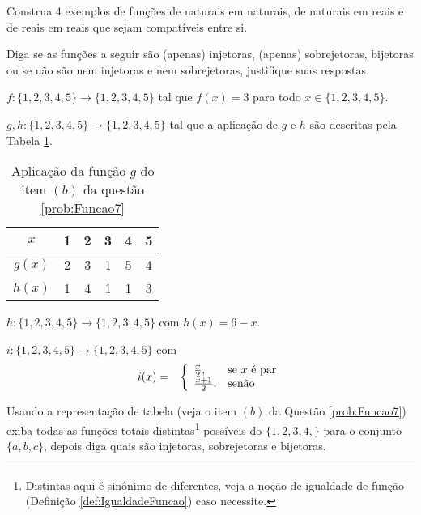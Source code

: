\begin{questao}\label{prob:Funcao6}
	Construa 4 exemplos de funções de naturais em naturais, de naturais em reais e de reais em reais que sejam compatíveis entre si.
\end{questao}

\begin{questao}\label{prob:Funcao7}
  Diga se as funções a seguir são (apenas) injetoras, (apenas) sobrejetoras, bijetoras ou se não são nem injetoras e nem sobrejetoras, justifique suas respostas.
\end{questao}

\begin{exerList}
  \item $f: \{1, 2, 3, 4, 5\} \rightarrow \{1, 2, 3, 4, 5\}$ tal que $f(x) = 3$ para todo $x \in \{1, 2, 3, 4, 5\}$.
  \item $g, h: \{1, 2, 3, 4, 5\} \rightarrow \{1, 2, 3, 4, 5\}$ tal que a aplicação de $g$ e $h$ são descritas pela Tabela \ref{tab:QuestaoFuncao7}.
  \begin{table}[h]
    \center
    \begin{tabular}{c|ccccc}
      \hline
      $x$ & 1 & 2 & 3 & 4 & 5\\
      \hline
      $g(x)$ & 2 & 3 & 1 & 5 & 4\\
      $h(x)$ & 1 & 4 & 1 & 1 & 3\\
      \hline
    \end{tabular}
    \caption{Aplicação da função $g$ do item $(b)$ da questão \ref{prob:Funcao7}}
    \label{tab:QuestaoFuncao7}
  \end{table}
  \item $h: \{1, 2, 3, 4, 5\} \rightarrow \{1, 2, 3, 4, 5\}$ com $h(x) = 6 - x$.
  \item $i: \{1, 2, 3, 4, 5\} \rightarrow \{1, 2, 3, 4, 5\}$ com \begin{eqnarray*}
      i(x) & = & \left\{\begin{array}{ll}	\frac{x}{2}, & \hbox{se } x \mbox{ é par}\\\frac{x + 1}{2},  & \hbox{senão}\end{array}\right.
	\end{eqnarray*}
\end{exerList}

\begin{questao}\label{prob:Funcao8}
  Usando a representação de tabela (veja o item $(b)$ da Questão \ref{prob:Funcao7}) exiba todas as funções totais distintas\footnote{Distintas aqui é sinônimo de diferentes, veja a noção de igualdade de função (Definição \ref{def:IgualdadeFuncao}) caso necessite.} possíveis do  $\{1, 2, 3, 4,\}$ para o conjunto $\{a, b, c\}$, depois diga quais são injetoras, sobrejetoras e bijetoras.
\end{questao}

